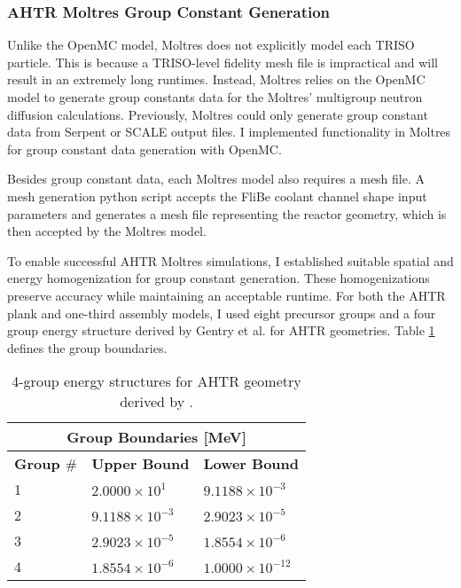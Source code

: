 \subsubsection{AHTR Moltres Group Constant Generation}
\label{sec:ahtr-moltres-group-constant-gen}
Unlike the OpenMC model, Moltres does not explicitly model each \gls{TRISO}
particle. 
This is because a TRISO-level fidelity mesh file is impractical and will result in an extremely 
long runtimes. 
Instead, Moltres relies on the OpenMC model to generate group constants data for the 
Moltres' multigroup neutron diffusion calculations. 
Previously, Moltres could only generate group constant data from Serpent 
\cite{leppanen_serpent_2014} or SCALE \cite{bucholz_scale:_1982} output files. 
I implemented functionality in Moltres for group constant data generation with 
OpenMC. 

Besides group constant data, each Moltres model also requires a mesh file. 
A mesh generation python script accepts the FliBe coolant channel shape input parameters 
and generates a mesh file representing the reactor geometry, which is then accepted by the 
Moltres model. 

To enable successful \gls{AHTR} Moltres simulations, I established suitable spatial and 
energy homogenization for group constant generation. 
These homogenizations preserve accuracy while maintaining an acceptable runtime.
For both the \gls{AHTR} plank and one-third assembly models, I used eight precursor groups 
and a four group energy structure derived by Gentry et al. \cite{gentry_development_2016} 
for \gls{AHTR} geometries. 
Table \ref{tab:energy_structures} defines the group boundaries. 
\begin{table}[]
    \centering
    \onehalfspacing
    \caption{4-group energy structures for \acrfull{AHTR} geometry 
    derived by \cite{gentry_development_2016}.}
	\label{tab:energy_structures}
    \footnotesize
    \begin{tabular}{lll}
    \hline
    \multicolumn{3}{c}{\textbf{Group Boundaries [MeV]}} \\ 
    \hline
    \textbf{Group $\#$}& \textbf{Upper Bound} & \textbf{Lower Bound}  \\
    \hline 
    1 & $2.0000\times 10^1$ & $9.1188\times 10^{-3}$ \\ 
    2 & $9.1188\times 10^{-3}$ & $2.9023\times 10^{-5}$\\
    3 & $2.9023\times 10^{-5}$ & $1.8554\times 10^{-6}$\\
    4 & $1.8554\times 10^{-6}$ & $1.0000\times 10^{-12}$\\
    \hline
    \end{tabular}
\end{table}

